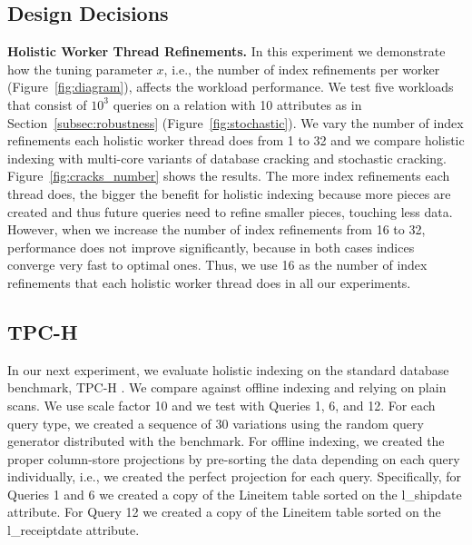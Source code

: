 \subsection{Design Decisions}
\label{subsec:decisions}
\textbf{Holistic Worker Thread Refinements.}
In this experiment we demonstrate how the tuning parameter $x$, i.e., the number of index refinements per worker (Figure~\ref{fig:diagram}), affects the workload performance.
We test five workloads that consist of $10^{3}$ queries on a relation with 10 attributes as in Section~\ref{subsec:robustness} (Figure~\ref{fig:stochastic}).
We vary the number of index refinements each holistic worker thread does from 1 to 32 and we compare holistic indexing with multi-core variants of database cracking and stochastic cracking.
Figure~\ref{fig:cracks_number} shows the results.
The more index refinements each thread does, the bigger the benefit for holistic indexing because more pieces are created and thus future queries need to refine smaller pieces, touching less data.
However, when we increase the number of index refinements from 16 to 32, performance does not improve significantly, because in both cases indices converge very fast to optimal ones.
Thus, we use 16 as the number of index refinements that each holistic worker thread does in all our experiments.


\subsection{TPC-H}
\label{subsec:tpch}

In our next experiment, 
we evaluate holistic indexing on the standard database benchmark, TPC-H  \cite{tpch}.
We compare against offline indexing and relying on plain scans.
We use scale factor 10 and we test with Queries 1, 6, and 12.
For each query type, we created a sequence of 30 variations using the random query generator distributed with the benchmark. 
For offline indexing, we created the proper column-store projections by pre-sorting the data
depending on each query individually, i.e., we created the perfect projection for each query.
Specifically, for Queries 1 and 6 we created a copy of the Lineitem table sorted on the l\_shipdate attribute.
For Query 12 we created a copy of the Lineitem table sorted on the l\_receiptdate attribute.


